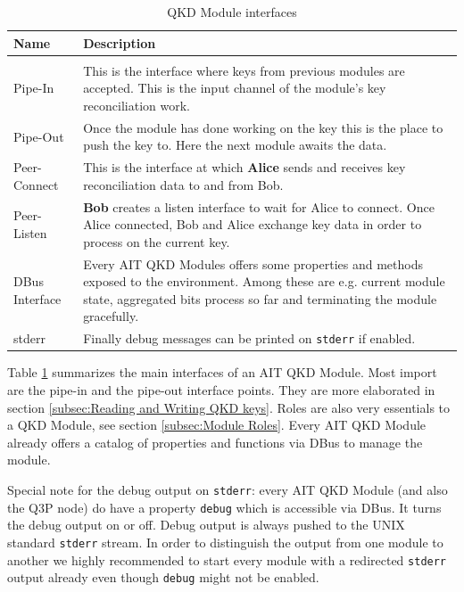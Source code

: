 \begin{table}[h]
    \begin{tabular}{lp{11.5cm}}
    Name            &   Description \\
    \hline
    \\
    Pipe-In         &   This is the interface where keys from previous modules are accepted. This is the input channel of the module's key reconciliation work.\\ [0.7em]
    Pipe-Out        &   Once the module has done working on the key this is the place to push the key to. Here the next module awaits the data.\\ [0.7em]
    Peer-Connect    &   This is the interface at which \textbf{Alice} sends and receives key reconciliation data to and from Bob.\\ [0.7em]
    Peer-Listen     &   \textbf{Bob} creates a listen interface to wait for Alice to connect. Once Alice connected, Bob and Alice exchange key data in order to process on the current key.\\ [0.7em]
    DBus Interface  &   Every AIT QKD Modules offers some properties and methods exposed to the environment. Among these are e.g. current module state, aggregated bits process so far and terminating the module gracefully.\\ [0.7em]
    stderr          &   Finally debug messages can be printed on \texttt{stderr} if enabled.\\ [0.7em]    
    \end{tabular}
    \caption{QKD Module interfaces}
    \label{tab:QKD Module interfaces}
\end{table}

\medskip

Table \ref{tab:QKD Module interfaces} summarizes the main interfaces of an AIT QKD Module. Most import are the pipe-in and the pipe-out interface points. They are more elaborated in section \ref{subsec:Reading and Writing QKD keys}. Roles are also very essentials to a QKD Module, see section \ref{subsec:Module Roles}. Every AIT QKD Module already offers a catalog of properties and functions via DBus to manage the module.

\medskip

Special note for the debug output on \texttt{stderr}: every AIT QKD Module (and also the Q3P node) do have a property \texttt{debug} which is accessible via DBus. It turns the debug output on or off. Debug output is always pushed to the UNIX standard \texttt{stderr} stream. In order to distinguish the output from one module to another we highly recommended to start every module with a redirected \texttt{stderr} output already even though \texttt{debug} might not be enabled.

